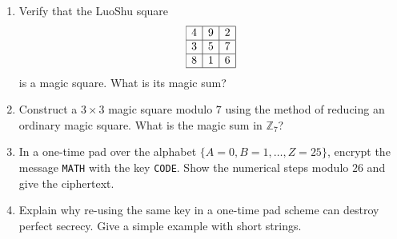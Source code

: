 \begin{enumerate}
  \item Verify that the LuoShu square
        \[
        \begin{array}{|c|c|c|}
        \hline
        4 & 9 & 2 \\
        \hline
        3 & 5 & 7 \\
        \hline
        8 & 1 & 6 \\
        \hline
        \end{array}
        \]
        is a magic square. What is its magic sum?

  \item Construct a $3\times 3$ magic square modulo $7$ using the method of reducing an ordinary magic square.
        What is the magic sum in $\mathbb{Z}_7$?

  \item In a one-time pad over the alphabet $\{A=0,B=1,\dots,Z=25\}$, encrypt the message 
        \texttt{MATH} with the key \texttt{CODE}. 
        Show the numerical steps modulo $26$ and give the ciphertext.

  \item Explain why re-using the same key in a one-time pad scheme can destroy perfect secrecy. 
        Give a simple example with short  strings.


\end{enumerate}
